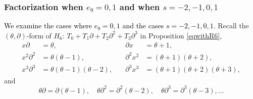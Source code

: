 \documentclass[a4paper,12pt]{article}
\theoremstyle{definition}
\theoremstyle{remark}
\numberwithin{equation}{section} %
\newcommand{\blue}[1]{\textcolor{black}{#1}}
\begin{document}
\subsubsection{Factorization when $e_9=0,1$ and when $s=-2,-1,0,1$}\label{factorH6}
\blue{We examine the cases where $e_9=0,1$ and the cases  $s=-2,-1,0,1$.} Recall the $(\theta,\partial)$-form of $H_6$: $T_0+T_1\partial+T_2\partial^2+T_3\partial^3$
 in Proposition \ref{eqwithR6},
\begin{equation}\begin{array}{llll}
   x\partial&=\theta,& \partial x&=\theta+1,\\
   x^2\partial^2&=\theta(\theta-1),& \partial^2x^2&=(\theta+1)(\theta+2),\\
   x^3\partial^3&=\theta(\theta-1)(\theta-2),\quad& \partial^3x^3&=(\theta+1)(\theta+2)(\theta+3),\end{array}\end{equation}
 and
 $$\theta\partial=\partial(\theta-1),\quad \theta\partial^2=\partial^2(\theta-2),\quad\theta\partial^3=\partial^3(\theta-3),\dots$$
\end{document}
